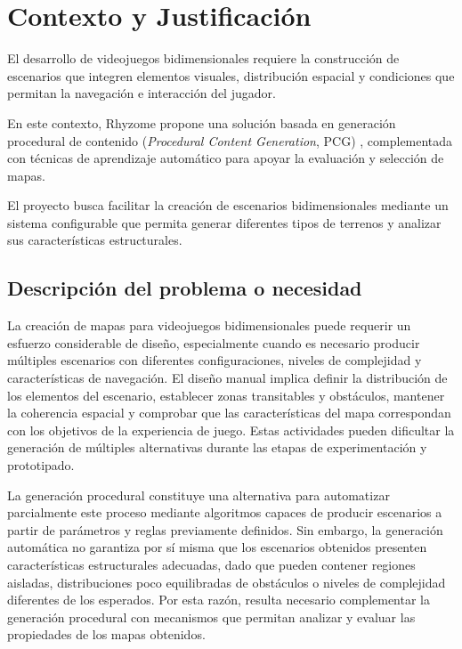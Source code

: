 \chapter{Contexto y Justificación}
\label{cap:02_contexto_justificacion}

El desarrollo de videojuegos bidimensionales requiere la construcción de escenarios que integren elementos visuales, distribución espacial y condiciones que permitan la navegación e interacción del jugador.

En este contexto, Rhyzome propone una solución basada en generación procedural de contenido (\textit{Procedural Content Generation}, PCG) \parencite{shaker2016}, complementada con técnicas de aprendizaje automático para apoyar la evaluación y selección de mapas.

El proyecto busca facilitar la creación de escenarios bidimensionales mediante un sistema configurable que permita generar diferentes tipos de terrenos y analizar sus características estructurales.

\section{Descripción del problema o necesidad}

La creación de mapas para videojuegos bidimensionales puede requerir un esfuerzo considerable de diseño, especialmente cuando es necesario producir múltiples escenarios con diferentes configuraciones, niveles de complejidad y características de navegación. El diseño manual implica definir la distribución de los elementos del escenario, establecer zonas transitables y obstáculos, mantener la coherencia espacial y comprobar que las características del mapa correspondan con los objetivos de la experiencia de juego. Estas actividades pueden dificultar la generación de múltiples alternativas durante las etapas de experimentación y prototipado.

La generación procedural constituye una alternativa para automatizar parcialmente este proceso mediante algoritmos capaces de producir escenarios a partir de parámetros y reglas previamente definidos. Sin embargo, la generación automática no garantiza por sí misma que los escenarios obtenidos presenten características estructurales adecuadas, dado que pueden contener regiones aisladas, distribuciones poco equilibradas de obstáculos o niveles de complejidad diferentes de los esperados. Por esta razón, resulta necesario complementar la generación procedural con mecanismos que permitan analizar y evaluar las propiedades de los mapas obtenidos.

